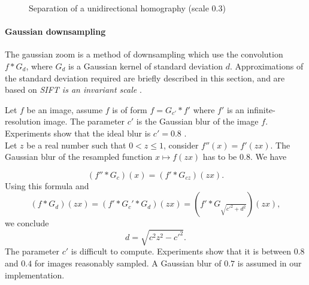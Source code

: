 \begin{figure}[h!]
\caption{Separation of a unidirectional homography (scale $0.3$) }
\label{image_separation_f14}
\end{figure}

\paragraph{Gaussian downsampling}
\label{zoom_gaussien}
The gaussian zoom is a method of downsampling which use the convolution $f*G_{d}$, where $G_d$ is a Gaussian kernel of standard deviation $d$. Approximations of the standard deviation required are briefly described in this section, and are based on \emph{SIFT is an invariant scale} \cite{morel2011sift}.


Let $f$ be an image, assume $f$ is of form $f=G_{c'} * f'$ where $f'$ is an infinite-resolution image. The parameter $c'$ is the Gaussian blur of the image $f$. Experiments show that the ideal blur is $c'=0.8$ \cite{morel2011sift}.\\
Let $z$ be a real number such that $0<z\le 1$, consider $f''(x)=f'(zx)$.
The Gaussian blur of the resampled function $x\mapsto f(zx)$ has to be $0.8$. We have

\begin{equation*}
(f''*G_{c})(x)=(f'*G_{cz})(zx).
\end{equation*}
Using this formula and 
\begin{equation*}
(f*G_d)(zx)=(f'*G_c'*G_d)(zx)=(f'*G_{\sqrt{c'^2 + d^2}})(zx),
\end{equation*}
we conclude
\begin{equation}
d=\sqrt{c^2 z^2 - c'^2}.
\label{formule_zoom_gaussien}
\end{equation}
The parameter $c'$ is difficult to compute. Experiments show that it is between $0.8$ and $0.4$ for images reasonably sampled. A Gaussian blur of $0.7$ is assumed in our implementation.


